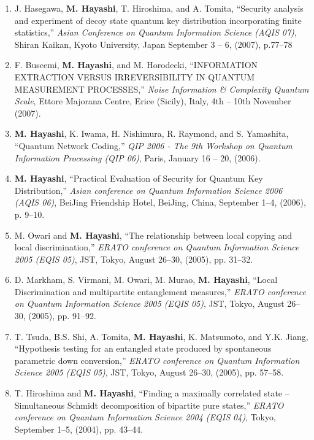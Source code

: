 \documentclass[a4paper,12pt,oneside]{article}
\begin{document}
\begin{enumerate}
\item
J. Hasegawa, \textbf{M. Hayashi}, T. Hiroshima, and A. Tomita, 
``Security analysis and experiment of decoy state quantum key distribution incorporating finite statistics,'' 
{\em Asian Conference on Quantum Information Science (AQIS 07)}, 
Shiran Kaikan, Kyoto University, Japan September 3 -- 6, (2007), p.77--78

\item
F. Buscemi, \textbf{M. Hayashi}, and M. Horodecki, ``INFORMATION EXTRACTION VERSUS IRREVERSIBILITY IN QUANTUM MEASUREMENT PROCESSES,'' 
{\em Noise Information \& Complexity \@ Quantum Scale}, 
Ettore Majorana Centre, Erice (Sicily), Italy, 4th -- 10th November (2007). 


\item
\textbf{M. Hayashi}, K. Iwama, H. Nishimura, R. Raymond, and S. Yamashita, ``Quantum Network Coding,'' 
{\em QIP 2006 - The 9th Workshop on Quantum Information Processing (QIP 06)}, 
Paris, January 16 -- 20, (2006).


\item
\textbf{M. Hayashi}, ``Practical Evaluation of Security for Quantum Key Distribution,'' 
{\em Asian conference on Quantum Information Science 2006 (AQIS 06)}, 
BeiJing Friendship Hotel, BeiJing, China, September 1--4, (2006), p. 9--10.


\item
M. Owari and \textbf{M. Hayashi}, ``The relationship between local copying and local discrimination,'' 
{\em ERATO conference on Quantum Information Science 2005 (EQIS 05)}, 
JST, Tokyo, August 26--30, (2005), pp. 31--32.

\item
D. Markham, S. Virmani, M. Owari, M. Murao, \textbf{M. Hayashi}, ``Local Discrimination and multipartite entanglement measures,'' 
{\em ERATO conference on Quantum Information Science 2005 (EQIS 05)}, 
JST, Tokyo, August 26--30, (2005), pp. 91--92.

\item
T. Tsuda, B.S. Shi, A. Tomita, \textbf{M. Hayashi}, K. Matsumoto, and Y.K. Jiang, ``Hypothesis testing for an entangled state produced by spontaneous parametric down conversion,'' 
{\em ERATO conference on Quantum Information Science 2005 (EQIS 05)}, 
JST, Tokyo, August 26--30, (2005), pp. 57--58.


\item
T. Hiroshima and \textbf{M. Hayashi}, ``Finding a maximally correlated state -- Simultaneous Schmidt decomposition of bipartite pure states,'' 
{\em ERATO conference on Quantum Information Science 2004 (EQIS 04)}, 
Tokyo, September 1--5, (2004), pp. 43--44.


\end{enumerate}
\end{document}
